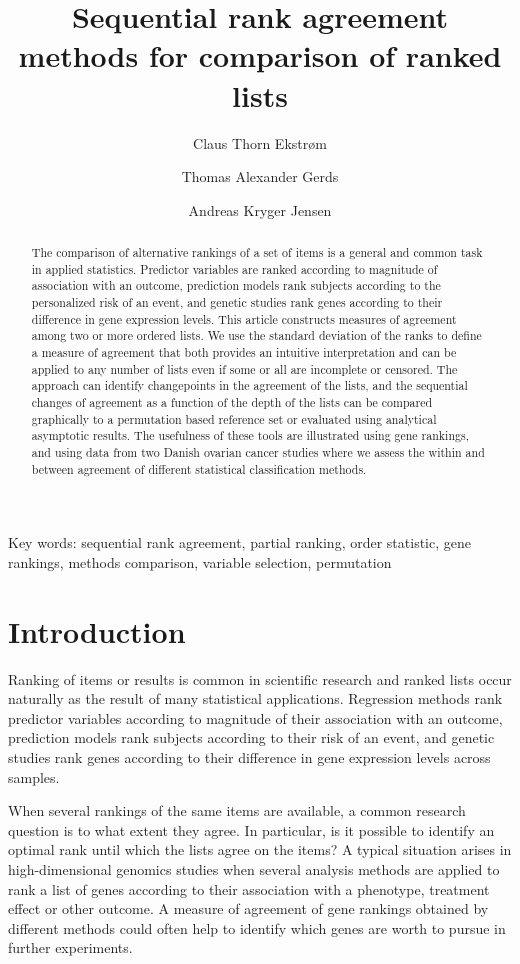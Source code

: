 \documentclass[12pt,a4paper]{article}
\title{Sequential rank agreement methods for comparison of ranked lists}
\author{Claus Thorn Ekstrøm}
\author{Thomas Alexander Gerds}
\author{Andreas Kryger Jensen}
\affil{Biostatistics, University of Copenhagen}
\theoremstyle{plain}
\begin{document}

\maketitle

\begin{abstract}
  The comparison of alternative rankings of a set of items is a
  general and common task in applied statistics. Predictor variables
  are ranked according to magnitude of association with an outcome,
  prediction models rank subjects according to the personalized risk
  of an event, and genetic studies rank genes according to their
  difference in gene expression levels. This article constructs
  measures of agreement among two or more ordered lists. We use the
  standard deviation of the ranks to define a measure of agreement
  that both provides an intuitive interpretation and can be applied to
  any number of lists even if some or all are incomplete or
  censored. The approach can identify changepoints in the agreement
  of the lists, and the sequential changes of agreement as a function
  of the depth of the lists can be compared graphically to a
  permutation based reference set or evaluated using analytical asymptotic
  results.  The usefulness of these tools are illustrated using gene
  rankings, and using data from two Danish ovarian cancer studies
  where we assess the within and between agreement of different
  statistical classification methods.
\end{abstract}

Key words: sequential rank agreement, partial ranking, order
statistic, gene rankings, methods comparison, variable selection,
permutation

\section{Introduction}

Ranking of items or results is common in scientific research and
ranked lists occur naturally as the result of many statistical
applications. Regression methods rank predictor variables according to
magnitude of their association with an outcome, prediction models rank
subjects according to their risk of an event, and genetic studies rank
genes according to their difference in gene expression levels across
samples.


When several rankings of the same items are available, a common
research question is to what extent they agree. In particular, is it
possible to identify an optimal rank until which the lists agree on
the items?  A typical situation arises in high-dimensional genomics
studies when several analysis methods are applied to rank a list of
genes according to their association with a phenotype, treatment
effect or other outcome. A measure of agreement of gene rankings
obtained by different methods could often help to identify which genes
are worth to pursue in further experiments.
\end{document}
